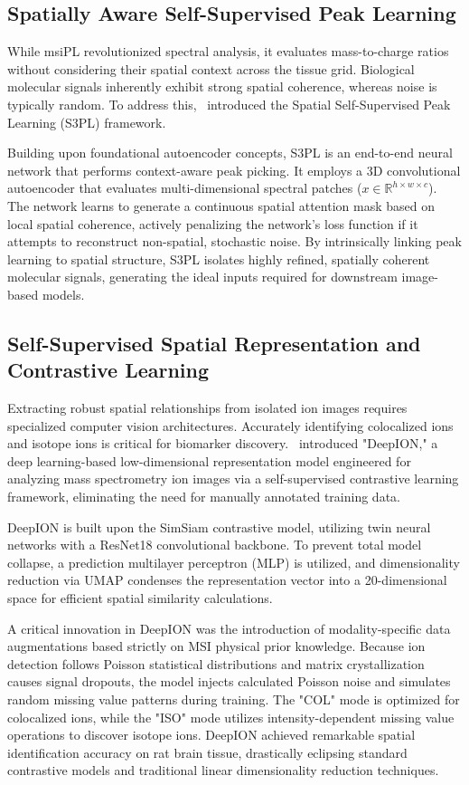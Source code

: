 \documentclass[
12pt, %
oneside, %
english, %
onehalfspacing, %
nolistspacing, %
headsepline, %
]{MastersDoctoralThesis} %
\begin{document}
\subsection*{Spatially Aware Self-Supervised Peak Learning}

While msiPL revolutionized spectral analysis, it evaluates mass-to-charge ratios without considering their spatial context across the tissue grid. Biological molecular signals inherently exhibit strong spatial coherence, whereas noise is typically random. To address this,~\citet{weigand2026spatial} introduced the Spatial Self-Supervised Peak Learning (S3PL) framework.

Building upon foundational autoencoder concepts, S3PL is an end-to-end neural network that performs context-aware peak picking. It employs a 3D convolutional autoencoder that evaluates multi-dimensional spectral patches ($x\in\mathbb{R}^{h\times w\times c}$). The network learns to generate a continuous spatial attention mask based on local spatial coherence, actively penalizing the network's loss function if it attempts to reconstruct non-spatial, stochastic noise. By intrinsically linking peak learning to spatial structure, S3PL isolates highly refined, spatially coherent molecular signals, generating the ideal inputs required for downstream image-based models.

\subsection*{Self-Supervised Spatial Representation and Contrastive Learning}

Extracting robust spatial relationships from isolated ion images requires specialized computer vision architectures. Accurately identifying colocalized ions and isotope ions is critical for biomarker discovery.~\citet{guo2024deepion} introduced "DeepION," a deep learning-based low-dimensional representation model engineered for analyzing mass spectrometry ion images via a self-supervised contrastive learning framework, eliminating the need for manually annotated training data.

DeepION is built upon the SimSiam contrastive model, utilizing twin neural networks with a ResNet18 convolutional backbone. To prevent total model collapse, a prediction multilayer perceptron (MLP) is utilized, and dimensionality reduction via UMAP condenses the representation vector into a 20-dimensional space for efficient spatial similarity calculations.

A critical innovation in DeepION was the introduction of modality-specific data augmentations based strictly on MSI physical prior knowledge. Because ion detection follows Poisson statistical distributions and matrix crystallization causes signal dropouts, the model injects calculated Poisson noise and simulates random missing value patterns during training. The "COL" mode is optimized for colocalized ions, while the "ISO" mode utilizes intensity-dependent missing value operations to discover isotope ions. DeepION achieved remarkable spatial identification accuracy on rat brain tissue, drastically eclipsing standard contrastive models and traditional linear dimensionality reduction techniques.
\end{document}
